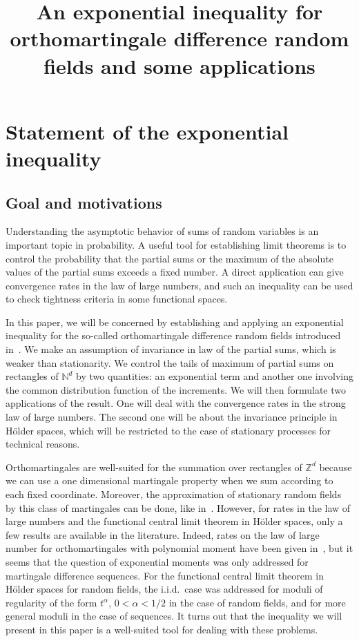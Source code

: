 \documentclass[AHL,Unicode,longabstracts,published]{cedram}
\title[An exponential inequality for orthomartingale difference random fields]{An exponential inequality for orthomartingale difference random fields and some applications}
\author[\initial{D.} \lastname{Giraudo}]{\firstname{Davide} \lastname{Giraudo}}
\newcommand\N{\mathbb{N}}
\newcommand\Z{\mathbb{Z}}
\begin{document}
\maketitle

\section{Statement of the exponential inequality}

\subsection{Goal and motivations} Understanding the asymptotic behavior of sums of random variables is an important topic in probability. A useful tool for establishing limit theorems is to control the probability that the partial sums or the maximum of the absolute values of the partial sums exceeds a fixed number. A direct application can give convergence rates in the law of large numbers, and such an inequality can be used to check tightness criteria in some functional spaces.

In this paper, we will be concerned by establishing and applying an exponential inequality for the so-called orthomartingale difference random fields introduced in~\cite{MR0254912}. We make an assumption of invariance in law of the partial sums, which is weaker than stationarity. We control the tails of maximum of partial sums on rectangles of $\N^d$ by two quantities: an exponential term and another one involving the common distribution function of the increments. We will then formulate two applications of the result. One will deal with the convergence rates in the strong law of large numbers. The second one will be about the invariance principle in H\"older spaces, which will be restricted to the case of stationary processes for technical reasons.

Orthomartingales are well-suited for the summation over rectangles of $\Z^d$ because we can use a one dimensional martingale property when we sum according to each fixed coordinate. Moreover, the approximation of stationary random fields by this class of martingales can be done, like in~\cite{MR3504508,MR3869881,MR3798239,MR4166203}. However, for rates in the law of large numbers and the functional central limit theorem in H\"older spaces, only a few results are available in the literature. Indeed, rates on the law of large number for orthomartingales with polynomial moment have been given in~\cite{MR4046858,MR2794415,MR3451971}, but it seems that the question of exponential moments was only addressed for martingale difference sequences. For the functional central limit theorem in H\"older spaces for random fields, the i.i.d.\ case was addressed for moduli of regularity of the form $t^\alpha$, $0<\alpha<1/2$ in the case of random fields, and for more general moduli in the case of sequences. It turns out that the inequality we will present in this paper is a well-suited tool for dealing with these problems.
\end{document}
